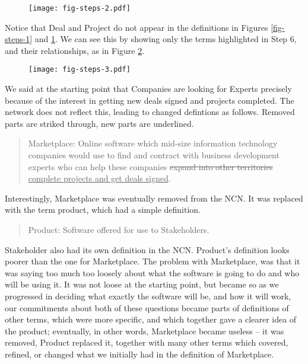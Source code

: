 \documentclass[graybox,envcountchap,sectrefs]{svmono}
\newcommand{\ncn}{NCN}
\newcommand{\newterm}[1]{\begin{quote}\textsf{#1}\end{quote}}
\newcommand{\nterm}[1]{\textsf{#1}}
\begin{document}
\begin{figure}[p]
 \centering
 \texttt{[image: fig-steps-2.pdf]}
 \caption{}
 \label{fig-steps-2}
\end{figure}

Notice that \nterm{Deal} and \nterm{Project} do not appear in the definitions in Figures \ref{fig-steps-1} and \ref{fig-steps-2}. We can see this by showing only the terms highlighted in Step 6, and their relationships, as in Figure \ref{fig-steps-3}. 

\begin{figure}[]
 \centering
 \texttt{[image: fig-steps-3.pdf]}
 \caption{}
 \label{fig-steps-3}
\end{figure}

We said at the starting point that \nterm{Companies} are looking for \nterm{Experts} precisely because of the interest in getting new deals signed and projects completed. The network does not reflect this, leading to changed defintions as follows. Removed parts are striked through, new parts are underlined.  

\newterm{Marketplace: Online software which mid-size information technology companies would use to find and contract with business development experts who can help these companies \sout{expand into other territories} \uline{complete projects and get deals signed}.}

Interestingly, \nterm{Marketplace} was eventually removed from the \ncn. It was replaced with the term \nterm{product}, which had a simple definition. 

\newterm{Product: Software offered for use to Stakeholders.}

\nterm{Stakeholder} also had its own definition in the \ncn. \nterm{Product}'s definition looks poorer than the one for \nterm{Marketplace}. The problem with \nterm{Marketplace}, was that it was saying too much too loosely about what the software is going to do and who will be using it. It was not loose at the starting point, but became so as we progressed in deciding what exactly the software will be, and how it will work, our commitments about both of these questions became parts of definitions of other terms, which were more specific, and which together gave a clearer idea of the product; eventually, in other words, \nterm{Marketplace} became useless -- it was removed, \nterm{Product} replaced it, together with many other terms which covered, refined, or changed what we initially had in the definition of \nterm{Marketplace}.
\end{document}
